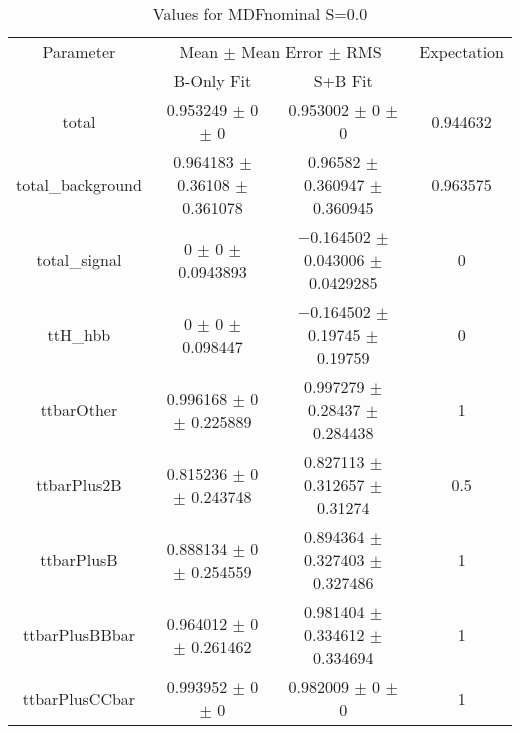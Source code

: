 \begin{table}
\centering
\caption{Values for MDFnominal S=0.0}
\begin{tabular}{cccc}
\toprule
Parameter & \multicolumn{2}{c}{Mean $\pm$ Mean Error $\pm$ RMS} & Expectation\\
 & B-Only Fit & S+B Fit & \\
\midrule
total & \num{0.953249} $\pm$ \num{0} $\pm$ \num{0} & \num{0.953002} $\pm$ \num{0} $\pm$ \num{0} & \num{0.944632}\\
total\_background & \num{0.964183} $\pm$ \num{0.36108} $\pm$ \num{0.361078} & \num{0.96582} $\pm$ \num{0.360947} $\pm$ \num{0.360945} & \num{0.963575}\\
total\_signal & \num{0} $\pm$ \num{0} $\pm$ \num{0.0943893} & \num{-0.164502} $\pm$ \num{0.043006} $\pm$ \num{0.0429285} & \num{0}\\
ttH\_hbb & \num{0} $\pm$ \num{0} $\pm$ \num{0.098447} & \num{-0.164502} $\pm$ \num{0.19745} $\pm$ \num{0.19759} & \num{0}\\
ttbarOther & \num{0.996168} $\pm$ \num{0} $\pm$ \num{0.225889} & \num{0.997279} $\pm$ \num{0.28437} $\pm$ \num{0.284438} & \num{1}\\
ttbarPlus2B & \num{0.815236} $\pm$ \num{0} $\pm$ \num{0.243748} & \num{0.827113} $\pm$ \num{0.312657} $\pm$ \num{0.31274} & \num{0.5}\\
ttbarPlusB & \num{0.888134} $\pm$ \num{0} $\pm$ \num{0.254559} & \num{0.894364} $\pm$ \num{0.327403} $\pm$ \num{0.327486} & \num{1}\\
ttbarPlusBBbar & \num{0.964012} $\pm$ \num{0} $\pm$ \num{0.261462} & \num{0.981404} $\pm$ \num{0.334612} $\pm$ \num{0.334694} & \num{1}\\
ttbarPlusCCbar & \num{0.993952} $\pm$ \num{0} $\pm$ \num{0} & \num{0.982009} $\pm$ \num{0} $\pm$ \num{0} & \num{1}\\
\bottomrule
\end{tabular}
\end{table}